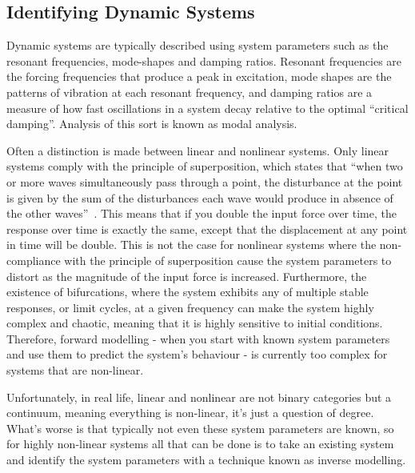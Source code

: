 \documentclass[12pt]{article}
\begin{document}
    \subsection{Identifying Dynamic Systems}

    Dynamic systems are typically described using system parameters such as the resonant frequencies, mode-shapes and damping ratios.
    Resonant frequencies are the forcing frequencies that produce a peak in excitation, mode shapes are the patterns of vibration at each resonant frequency, and damping ratios are a measure of how fast oscillations in a system decay relative to the optimal ``critical damping''.
    Analysis of this sort is known as modal analysis.


    Often a distinction is made between linear and nonlinear systems.
    Only linear systems comply with the principle of superposition, which states that ``when two or more waves simultaneously pass through a point, the disturbance at the point is given by the sum of the disturbances each wave would produce in absence of the other waves''~\cite{StudyComSuperposition}.
    This means that if you double the input force over time, the response over time is exactly the same, except that the displacement at any point in time will be double.
    This is not the case for nonlinear systems where the non-compliance with the principle of superposition cause the system parameters to distort as the magnitude of the input force is increased.
    Furthermore, the existence of bifurcations, where the system exhibits any of multiple stable responses, or limit cycles, at a given frequency can make the system highly complex and chaotic, meaning that it is highly sensitive to initial conditions.
    Therefore, forward modelling - when you start with known system parameters and use them to predict the system's behaviour - is currently too complex for systems that are non-linear.

    Unfortunately, in real life, linear and nonlinear are not binary categories but a continuum, meaning everything is non-linear, it's just a question of degree.
    What's worse is that typically not even these system parameters are known, so for highly non-linear systems all that can be done is to take an existing system and identify the system parameters with a technique known as inverse modelling.
\end{document}
